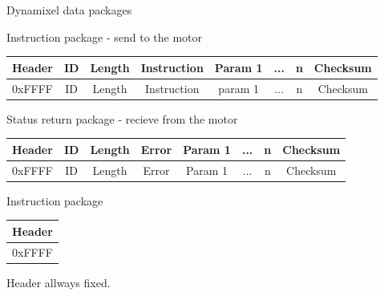 \documentclass{beamer}
\begin{document}
\begin{frame}{Dynamixel data packages}

    Instruction package - send to the motor

    \begin{table}
        \begin{tabular}{| c | c | c | c | c | c | c | c |}
            \hline
            Header & ID & Length & Instruction & Param 1 & ... & n & Checksum\\
            \hline
            0xFFFF & ID & Length & Instruction & param 1 & ... & n & Checksum\\
            \hline
        \end{tabular}
    \end{table}
    
    Status return package - recieve from the motor

    \begin{table}
        \begin{tabular}{| c | c | c | c | c | c | c | c |}
            \hline
            Header & ID & Length & Error & Param 1 & ... & n & Checksum\\
            \hline
            0xFFFF & ID & Length & Error & Param 1 & ... & n & Checksum\\
            \hline
        \end{tabular}
    \end{table}
    
\end{frame}




\begin{frame}{Instruction package}
    
        \begin{table}
            \begin{flushleft}
                \begin{tabular}{| c |}
                    \hline
                    Header\\
                    \hline
                    0xFFFF\\
                    \hline
                \end{tabular}
            \end{flushleft}
        \end{table}

        Header allways fixed.

\end{frame}
\end{document}
